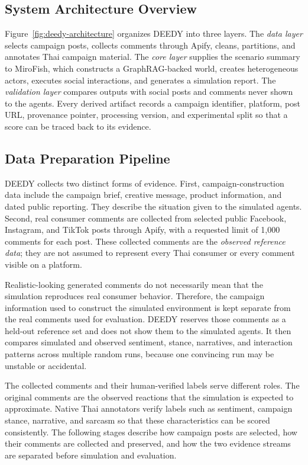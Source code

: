 \documentclass[conference]{IEEEtran}
\begin{document}
\subsection{System Architecture Overview}

Figure~\ref{fig:deedy-architecture} organizes DEEDY into three layers. The
\emph{data layer} selects campaign posts, collects comments through Apify,
cleans, partitions, and annotates Thai campaign material. The \emph{core layer}
supplies the scenario summary to
MiroFish, which constructs a GraphRAG-backed world, creates heterogeneous
actors, executes social interactions, and generates a simulation report. The
\emph{validation layer} compares outputs with social posts and comments never
shown to the agents. Every derived artifact records a campaign identifier,
platform, post URL, provenance pointer, processing version, and experimental
split so that a score can be traced back to its evidence.

\subsection{Data Preparation Pipeline}

DEEDY collects two distinct forms of evidence. First, campaign-construction
data include the campaign brief, creative message, product information, and
dated public reporting. They describe the situation given to the simulated agents.
Second, real consumer comments are collected from selected public Facebook,
Instagram, and TikTok posts through Apify, with a requested limit of 1,000
comments for each post. These collected comments are the \emph{observed
reference data}; they are not assumed to represent every Thai consumer or
every comment visible on a platform.

Realistic-looking generated comments do not necessarily mean that the
simulation reproduces real consumer behavior. Therefore, the campaign
information used to construct the simulated environment is kept separate from
the real comments used for evaluation. DEEDY reserves those comments as a
held-out reference set and does not show them to the simulated agents. It then
compares simulated and observed sentiment, stance, narratives, and interaction
patterns across multiple random runs, because one convincing run may be
unstable or accidental.

The collected comments and their human-verified labels serve different roles.
The original comments are the observed reactions that the simulation is
expected to approximate. Native Thai annotators verify labels such as
sentiment, campaign stance, narrative, and sarcasm so that these characteristics
can be scored consistently. The following stages describe how campaign posts
are selected, how their comments are collected and preserved, and how the two
evidence streams are separated before simulation and evaluation.
\end{document}
